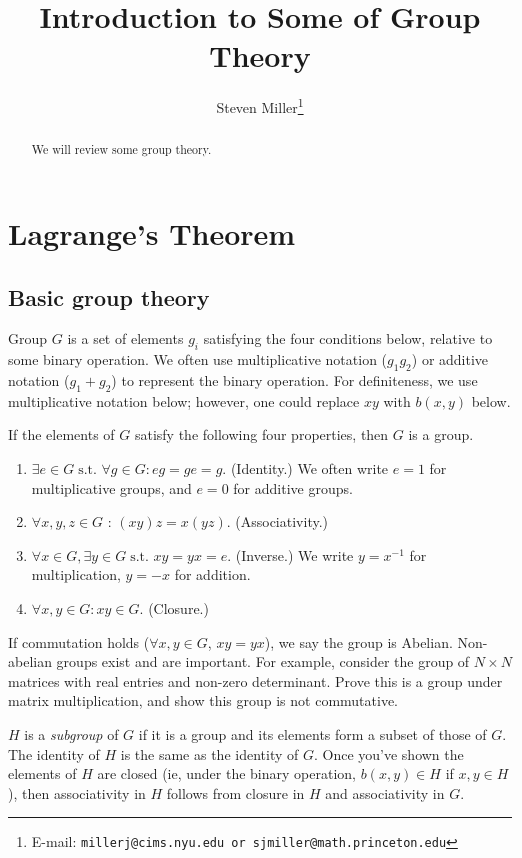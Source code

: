 \documentclass[12pt,letterpaper]{article}
\title{Introduction to Some of Group Theory}
\author{Steven Miller\thanks{E-mail:
\texttt{millerj@cims.nyu.edu or sjmiller@math.princeton.edu}}}
\date{}
\newcommand\st{\mbox{s.t.\ }}
\newcommand\ben{\begin{enumerate}}
\newcommand\een{\end{enumerate}}
\begin{document}
\maketitle %

\begin{abstract}We will review some group theory.
\end{abstract}


\section{Lagrange's Theorem}

\subsection{Basic group theory}

Group $G$ is a set of elements $g_i$ satisfying the four
conditions below, relative to some binary operation. We often use
multiplicative notation ($g_1 g_2$) or additive notation ($g_1 +
g_2$) to represent the binary operation. For definiteness, we use
multiplicative notation below; however, one could replace $xy$
with $b(x,y)$ below.

If the elements of $G$ satisfy the following four properties, then
$G$ is a group.

\ben
\item $\exists e \in G \;\st \forall g \in G : eg = ge = g$. (Identity.)
We often write $e=1$ for multiplicative groups, and $e = 0$ for
additive groups.

\item $\forall x,y,z \in G$ : $(xy)z = x(yz)$. (Associativity.)

\item $\forall x \in G, \exists y \in G \;\st xy = yx = e$. (Inverse.)
We write $y = x^{-1}$ for multiplication, $y = -x$ for addition.

\item $\forall x,y \in G : xy \in G$. (Closure.)
\een

If commutation holds ($\forall x, y \in G$, $xy = yx$), we say the
group is Abelian. Non-abelian groups exist and are important. For
example, consider the group of $N \times N$ matrices with real
entries and non-zero determinant. Prove this is a group under
matrix multiplication, and show this group is not commutative.

$H$ is a {\em subgroup} of $G$ if it is a group and its elements
form a subset of those of $G$. The identity of $H$ is the same as
the identity of $G$. Once you've shown the elements of $H$ are
closed (ie, under the binary operation, $b(x,y) \in H$ if $x, y
\in H$), then associativity in $H$ follows from closure in $H$ and
associativity in $G$.
\end{document}
